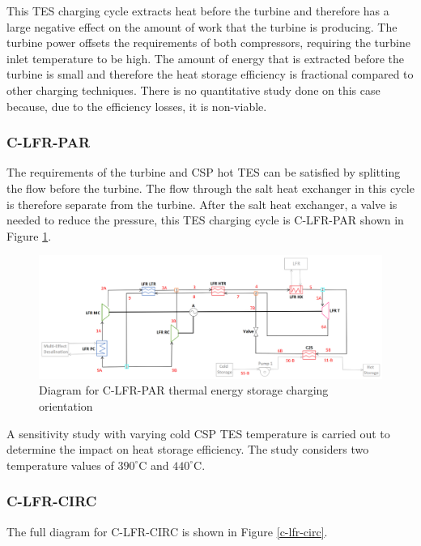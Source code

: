 \begin{paracol}{2}
\linenumbers
\switchcolumn

This TES charging cycle extracts heat before the turbine and therefore has a large negative effect on the amount of work that the turbine is producing. The turbine power offsets the requirements of both compressors, requiring the turbine inlet temperature to be high. The amount of energy that is extracted before the turbine is small and therefore the heat storage efficiency is fractional compared to other charging techniques. There is no quantitative study done on this case because, due to the efficiency losses, it is non-viable. 

\subsubsection{C-LFR-PAR} 

The requirements of the turbine and CSP hot TES can be satisfied by splitting the flow before the turbine. The flow through the salt heat exchanger in this cycle is therefore separate from the turbine. After the salt heat exchanger, a valve is needed to reduce the pressure, this TES charging cycle is C-LFR-PAR shown in Figure \ref{c-lfr-par}.

\end{paracol}
\begin{figure}[H]
    \widefigure
    \includegraphics[width=\linewidth]{Definitions/c-lfr-par.pdf}
    \caption{Diagram for C-LFR-PAR thermal energy storage charging orientation\label{c-lfr-par}}
\end{figure}
\begin{paracol}{2}
\linenumbers
\switchcolumn

A sensitivity study  with varying cold CSP TES temperature is carried out to determine the impact on heat storage efficiency. The study considers two temperature values of $390^{\circ}$C and $440^{\circ}$C.

\subsubsection{C-LFR-CIRC} 

The full diagram for C-LFR-CIRC is shown in Figure \ref{c-lfr-circ}.

\end{paracol}
